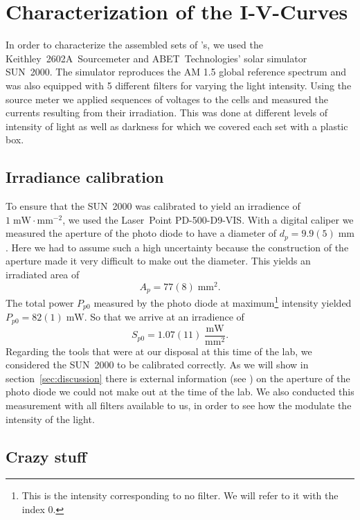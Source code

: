 
\section{Characterization of the I-V-Curves}\label{sec:charac}

In order to characterize the assembled sets of \BHSC's, we used the Keithley~2602A~Sourcemeter and ABET~Technologies’ solar simulator SUN~2000. The simulator reproduces the AM 1.5 global reference spectrum and was also equipped with 5 different filters for varying the light intensity. Using the source meter we applied sequences of voltages to the cells and measured the currents resulting from their irradiation. This was done at different levels of intensity of light as well as darkness for which we covered each set with a plastic box.
\subsection{Irradiance calibration}
To ensure that the SUN~2000 was calibrated to yield an irradience of $1\;\text{mW}\!\cdot\text{mm}^{-2}$, we used the Laser~Point PD-500-D9-VIS. With a digital caliper we measured the aperture of the photo diode to have a diameter of $d_p = 9.9(5)\;\text{mm}$. Here we had to assume such a high uncertainty because the construction of the aperture made it very difficult to make out the diameter. This yields an irradiated area of
\begin{equation*}
A_p =  77(8)\;\text{mm}^2.
\end{equation*}
The total power $P_{p0}$ measured by the photo diode at maximum\footnote{This is the intensity corresponding to no filter. We will refer to it with the index 0.} intensity yielded $P_{p0} = 82(1)\;\text{mW}$. So that we arrive at an irradience of
\begin{equation*}
S_{p0} = 1.07(11)\;\frac{\text{mW}}{\text{mm}^2}.
\end{equation*}
Regarding the tools that were at our disposal at this time of the lab, we considered the SUN~2000 to be calibrated correctly. As we will show in section~\ref{sec:discussion} there is external information (see \cite{photodiode}) on the aperture of the photo diode we could not make out at the time of the lab.\mypar
We also conducted this measurement with all filters available to us, in order to see how the modulate the intensity of the light.

\subsection{Crazy stuff}


